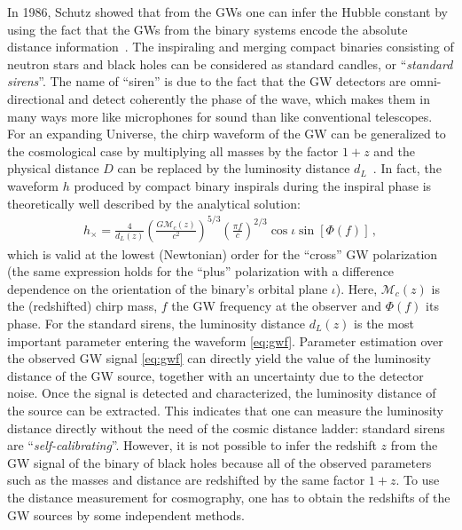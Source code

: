 \documentclass[a4paper,11pt]{article}
\begin{document}
In 1986, Schutz showed that from the GWs one can infer the Hubble constant by using the fact that the GWs from the binary systems encode the absolute distance information~\cite{Schutz:1986gp}. The inspiraling and merging compact binaries consisting of neutron stars and black holes can be considered as standard candles, or ``\textit{standard sirens}''. The name of ``siren'' is due to the fact that the GW detectors are omni-directional and detect coherently the phase of the wave, which  makes them in many ways more like microphones for sound than like conventional telescopes. For an expanding Universe, the chirp waveform of the GW can be generalized to the cosmological case by multiplying all masses by the factor $1+z$ and the physical distance $D$ can be replaced by the luminosity distance $d_L$~\cite{Krolak:1987ofj,Sathyaprakash:2009xs}.
In fact, the waveform $h$ produced by compact binary inspirals during the inspiral phase is theoretically well described by the analytical solution:
\begin{align}
	h_\times = \frac{4}{d_L(z)} \left( \frac{G \mathcal{M}_c(z)}{c^2} \right)^{5/3} \left( \frac{\pi f}{c} \right)^{2/3} \cos\iota \sin[\Phi(f)] \,,
	\label{eq:gwf}
\end{align}
which is valid at the lowest (Newtonian) order for the ``cross'' GW polarization (the same expression holds for the ``plus'' polarization with a difference dependence on the orientation of the binary's orbital plane $\iota$). Here, $\mathcal{M}_c(z)$ is the (redshifted) chirp mass, $f$ the GW frequency at the observer and $\Phi(f)$ its phase. For the standard sirens, the luminosity distance $d_L(z)$ is the most important parameter entering the waveform \eqref{eq:gwf}. Parameter estimation over the observed GW signal \eqref{eq:gwf} can directly yield the value of the luminosity distance of the GW source, together with an uncertainty due to the detector noise. Once the signal is detected and characterized, the luminosity distance of the source can be extracted. This indicates that one can measure the luminosity distance directly without the need of the cosmic distance ladder: standard sirens are ``\textit{self-calibrating}''. However, it is not possible to infer the redshift $z$ from the GW signal of the binary of black holes because all of the observed parameters such as the masses and distance are redshifted by the same factor $1+z$. To use the distance measurement for cosmography, one has to obtain the redshifts of the GW sources by some independent methods.
\end{document}
